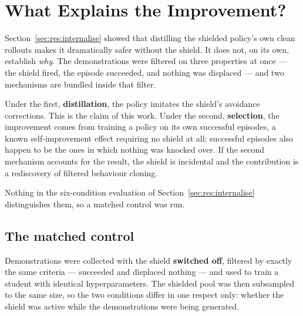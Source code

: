 %
%

\section{What Explains the Improvement?}\label{sec:res:mechanism}

Section~\ref{sec:res:internalise} showed that distilling the shielded policy's own clean rollouts
makes it dramatically safer without the shield. It does not, on its own, establish \emph{why}. The
demonstrations were filtered on three properties at once --- the shield fired, the episode
succeeded, and nothing was displaced --- and two mechanisms are bundled inside that filter.

Under the first, \textbf{distillation}, the policy imitates the shield's avoidance corrections.
This is the claim of this work. Under the second, \textbf{selection}, the improvement comes from
training a policy on its own successful episodes, a known self-improvement effect requiring no
shield at all; successful episodes also happen to be the ones in which nothing was knocked over. If
the second mechanism accounts for the result, the shield is incidental and the contribution is a
rediscovery of filtered behaviour cloning.

Nothing in the six-condition evaluation of Section~\ref{sec:res:internalise} distinguishes them, so
a matched control was run.

\subsection*{The matched control}

Demonstrations were collected with the shield \textbf{switched off}, filtered by exactly the same
criteria --- succeeded and displaced nothing --- and used to train a student with identical
hyperparameters. The shielded pool was then subsampled to the same size, so the two conditions
differ in one respect only: whether the shield was active while the demonstrations were being
generated.

